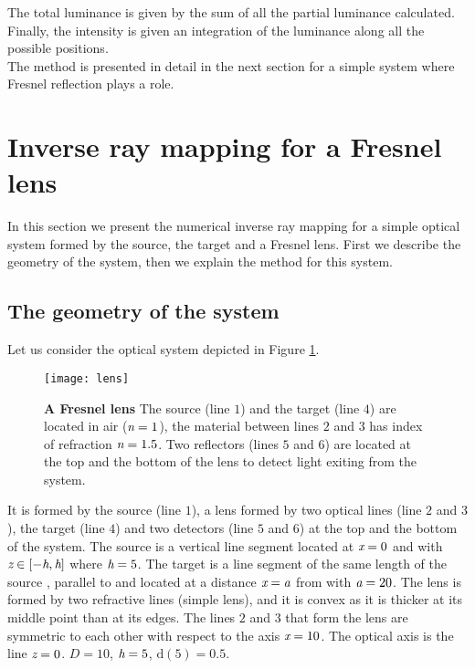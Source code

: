 The total luminance is given by the sum of all the partial luminance calculated.
Finally, the intensity is given an integration of the luminance along all the possible positions.
\\ \indent
The method is presented in detail in the next section for a simple system where Fresnel reflection plays a role.
\section{Inverse ray mapping for a Fresnel lens}
In this section we present the numerical  inverse ray mapping for a simple optical system formed by the source, the target and a Fresnel lens.
First we describe the geometry of the system, then we explain the method for this system.
\subsection{The geometry of the system}
Let us consider the optical system depicted in Figure \ref{fig:lens}. 
\begin{figure}[t]
  \begin{center}
  \texttt{[image: lens]}
  \end{center}
  \caption{\textbf{A Fresnel lens}
The source (line $1$) and the target (line $4$) are located in air ($\textit{n} = 1$), the material between lines $2$ and $3$ has index of refraction $\textit{n}=1.5$. 
Two reflectors (lines $5$ and $6$) are located at the top and the bottom of the lens to detect light exiting from the system.}
\label{fig:lens}
 \end{figure}
It is formed by the source (line $1$), a lens formed by two optical lines (line $2$ and $3$), the target (line $4$) and two detectors (line $5$ and $6$) at the top and the bottom of the system. The source  is a vertical line segment located at $\textit{x}=0$ and with 
$\textit{z}\in[-\textit{h}, \textit{h}]$ where $\textit{h}=5$. The target  is a line segment of the same length of the source , parallel to  and located at a distance $\textit{x}=\textit{a}$ from  with $\textit{a} = 20$. The lens is formed by two refractive lines (simple lens), and it is convex as it is thicker at its middle point than at its edges.
The lines $2$ and $3$ that form the lens are symmetric to each other with respect to the axis $\textit{x}=10$. The optical axis is the line $\textit{z}=0$. $D=10$, $\textit{h}=5$, $\textrm{d}(5)=0.5$.
